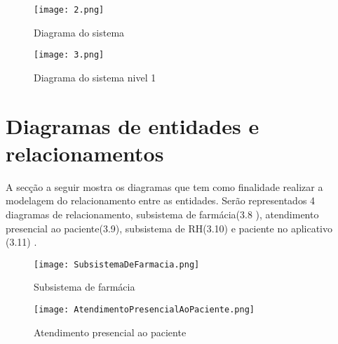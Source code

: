      \begin{figure}[H]
              \begin{center}
                  \caption{Diagrama do sistema} \label{afp}
                  \texttt{[image: 2.png]} \\

              \end{center}
             \end{figure}


             \begin{figure}[H]
              \begin{center}
                  \caption{Diagrama do sistema nivel 1} \label{afp}
                  \texttt{[image: 3.png]} \\

              \end{center}
             \end{figure}

\section{ Diagramas de entidades e relacionamentos}

A secção a seguir mostra os diagramas que tem como finalidade realizar a modelagem do relacionamento entre as entidades. Serão representados 4 diagramas de relacionamento, subsistema de farmácia(3.8 ), atendimento presencial ao paciente(3.9),  subsistema de RH(3.10) e paciente no aplicativo (3.11) .
              \begin{figure}[H]
              \begin{center}
                  \caption{Subsistema de farmácia} \label{afp}
                  \texttt{[image: SubsistemaDeFarmacia.png]} \\

              \end{center}
             \end{figure}
             
             
                      \begin{figure}[H]
              \begin{center}
                  \caption{Atendimento presencial ao paciente} \label{afp}
                  \texttt{[image: AtendimentoPresencialAoPaciente.png]} \\

              \end{center}
             \end{figure}
             
